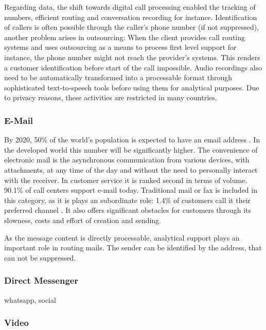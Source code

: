 		Regarding data, the shift towards digital call processing enabled the tracking of numbers, efficient routing and conversation recording for instance. Identification of callers is often possible through the caller's phone number (if not suppressed), another problem arises in outsourcing: When the client provides call routing systems and uses outsourcing as a means to process first level support for instance, the phone number might not reach the provider's systems. This renders a customer identification before start of the call impossible. Audio recordings also need to be automatically transformed into a processable format through sophisticated text-to-speech tools before using them for analytical purposes. Due to privacy reasons, these activities are restricted in many countries. 
		
		\subsubsection{E-Mail}
		
		By 2020, 50\% of the world's population is expected to have an email address \cite{radial2016}. In the developed world this number will be significantly higher. The convenience of electronic mail is the asynchronous communication from various devices, with attachments, at any time of the day and without the need to personally interact with the receiver. In customer service it is ranked second in terms of volume. 90.1\% of call centers support e-mail \cite{dimensiondata2016} today. Traditional mail or fax is included in this category, as it is plays an subordinate role: 1.4\% of customers call it their preferred channel \cite{ocm2015}. It also offers significant obstacles for customers through its slowness, costs and effort of creation and sending. 
		
		As the message content is directly processable, analytical support plays an important role in routing mails. The sender can be identified by the address, that can not be suppressed. 
		
		\subsubsection{Direct Messenger}
		
		whatsapp, social 
		\subsubsection{Video}
		
